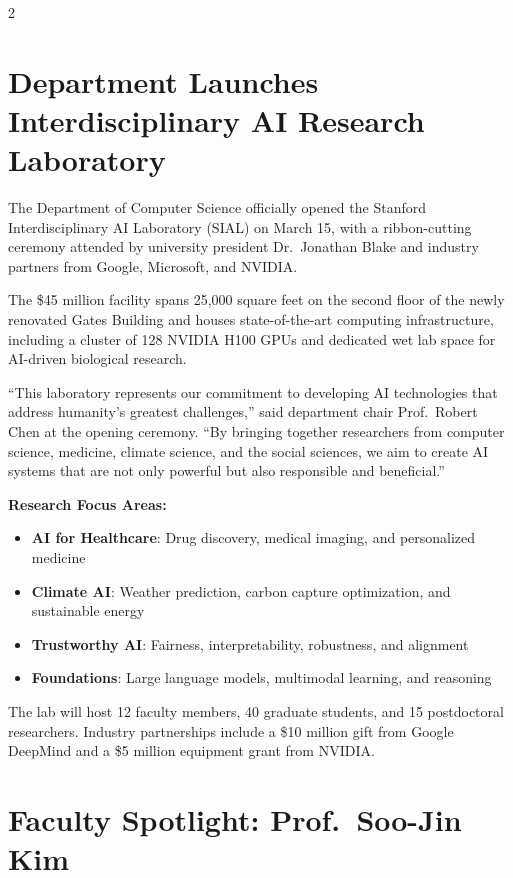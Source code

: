 \documentclass[10pt,a4paper]{article}
\begin{document}
\begin{multicols}{2}

\section{Department Launches Interdisciplinary AI Research Laboratory}

The Department of Computer Science officially opened the Stanford Interdisciplinary AI Laboratory (SIAL) on March 15, with a ribbon-cutting ceremony attended by university president Dr.\ Jonathan Blake and industry partners from Google, Microsoft, and NVIDIA.

The \$45 million facility spans 25,000 square feet on the second floor of the newly renovated Gates Building and houses state-of-the-art computing infrastructure, including a cluster of 128 NVIDIA H100 GPUs and dedicated wet lab space for AI-driven biological research.

``This laboratory represents our commitment to developing AI technologies that address humanity's greatest challenges,'' said department chair Prof.\ Robert Chen at the opening ceremony. ``By bringing together researchers from computer science, medicine, climate science, and the social sciences, we aim to create AI systems that are not only powerful but also responsible and beneficial.''

\textbf{Research Focus Areas:}
\begin{itemize}[leftmargin=1.2em, nosep, itemsep=2pt]
  \item \textbf{AI for Healthcare}: Drug discovery, medical imaging, and personalized medicine
  \item \textbf{Climate AI}: Weather prediction, carbon capture optimization, and sustainable energy
  \item \textbf{Trustworthy AI}: Fairness, interpretability, robustness, and alignment
  \item \textbf{Foundations}: Large language models, multimodal learning, and reasoning
\end{itemize}

The lab will host 12 faculty members, 40 graduate students, and 15 postdoctoral researchers. Industry partnerships include a \$10 million gift from Google DeepMind and a \$5 million equipment grant from NVIDIA.

\section{Faculty Spotlight: Prof.\ Soo-Jin Kim}


\end{multicols}
\end{document}
